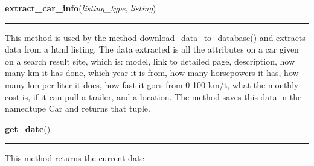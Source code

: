     \label{BilbasenDataMining:bilbasen:extract_car_info}

    \vspace{0.5ex}

\hspace{.8\funcindent}\begin{boxedminipage}{\funcwidth}

    \raggedright \textbf{extract\_car\_info}(\textit{listing\_type}, \textit{listing})

    \vspace{-1.5ex}

    \rule{\textwidth}{0.5\fboxrule}
\setlength{\parskip}{2ex}
    This method is used by the method download\_data\_to\_database() and 
    extracts data from a html listing. The data extracted is all the 
    attributes on a car given on a search result site, which is: model, 
    link to detailed page, description, how many km it has done, which year
    it is from, how many horsepowers it has, how many km per liter it does,
    how fast it goes from 0-100 km/t, what the monthly cost is, if it can 
    pull a trailer, and a location. The method saves this data in the 
    namedtupe Car and returns that tuple.

\setlength{\parskip}{1ex}
    \end{boxedminipage}

    \label{BilbasenDataMining:bilbasen:get_date}

    \vspace{0.5ex}

\hspace{.8\funcindent}\begin{boxedminipage}{\funcwidth}

    \raggedright \textbf{get\_date}()

    \vspace{-1.5ex}

    \rule{\textwidth}{0.5\fboxrule}
\setlength{\parskip}{2ex}
    This method returns the current date

\setlength{\parskip}{1ex}
    \end{boxedminipage}

    \label{BilbasenDataMining:bilbasen:get_car_image_src}

